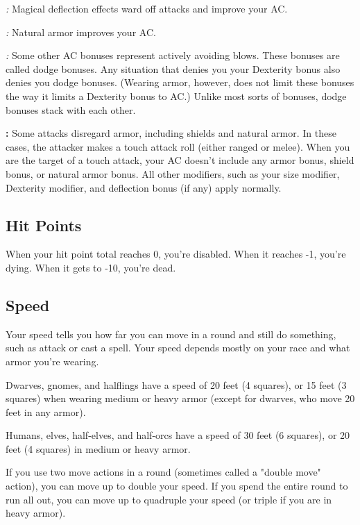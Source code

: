 \textit{:} Magical deflection effects ward off attacks and improve your AC.

\textit{:} Natural armor improves your AC.

\textit{:} Some other AC bonuses represent actively avoiding blows. These bonuses are called dodge bonuses. Any situation that denies you your Dexterity bonus also denies you dodge bonuses. (Wearing armor, however, does not limit these bonuses the way it limits a Dexterity bonus to AC.) Unlike most sorts of bonuses, dodge bonuses stack with each other.

\textbf{:} Some attacks disregard armor, including shields and natural armor. In these cases, the attacker makes a touch attack roll (either ranged or melee). When you are the target of a touch attack, your AC doesn't include any armor bonus, shield bonus, or natural armor bonus. All other modifiers, such as your size modifier, Dexterity modifier, and deflection bonus (if any) apply normally.

\subsection{Hit Points}

When your hit point total reaches 0, you're disabled. When it reaches -1, you're dying. When it gets to -10, you're dead.

\subsection{Speed}

Your speed tells you how far you can move in a round and still do something, such as attack or cast a spell. Your speed depends mostly on your race and what armor you're wearing.

Dwarves, gnomes, and halflings have a speed of 20 feet (4 squares), or 15 feet (3 squares) when wearing medium or heavy armor (except for dwarves, who move 20 feet in any armor).

Humans, elves, half-elves, and half-orcs have a speed of 30 feet (6 squares), or 20 feet (4 squares) in medium or heavy armor.

If you use two move actions in a round (sometimes called a "double move" action), you can move up to double your speed. If you spend the entire round to run all out, you can move up to quadruple your speed (or triple if you are in heavy armor).

